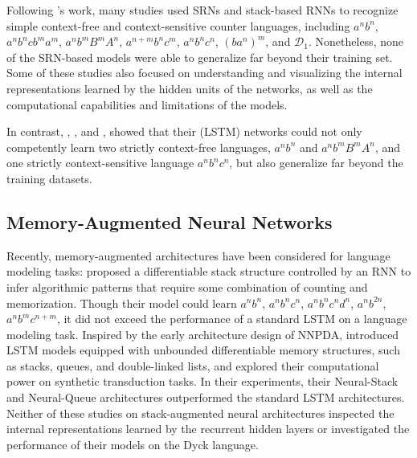 \documentclass[11pt,a4paper]{article}
\theoremstyle{plain}
\newcommand{\dyck}[1]{\ensuremath{\mathcal{D}_{#1}}}
\begin{document}
Following \citeauthor{elman1991distributed}'s work, many studies used SRNs \citep{steijvers1996recurrent, tonkes1997learning,holldobler1997designing,rodriguez1998recurrent,boden1999learning, boden2000context,rodriguez2001simple} and stack-based RNNs \cite{das1993using,zeng1994discrete} to recognize simple context-free and context-sensitive counter languages, including $a^n b^n$, $a^nb^ncb^ma^m$, $a^nb^mB^mA^n$, $a^{n+m}b^nc^{m}$, $a^n b^n c^n$, $(ba^n)^m$, and \dyck{1}. Nonetheless, none of the SRN-based models were able to generalize far beyond their training set. Some of these studies also focused on understanding and visualizing the internal representations learned by the hidden units of the networks, as well as the computational capabilities and limitations of the models.

In contrast, \citet{gers2001lstm}, \citet{schmidhuber2002learning}, and \citet{gers2002learning}, showed that their (LSTM) networks could not only competently learn two strictly context-free languages, $a^n b^n$ and $a^n b^m B^m A^n$, and one strictly context-sensitive language $a^n b^n c^n$, but also generalize far beyond the training datasets. 

\vspace{-0.5em}
 \subsection{Memory-Augmented Neural Networks}
Recently, memory-augmented architectures have been considered for language modeling tasks: \citet{joulin2015inferring} proposed a differentiable stack structure controlled by an RNN to infer algorithmic patterns that require some combination of counting and memorization. Though their model could learn $a^n b^n$, $a^n b^n c^n$, $a^n b^n c^n d^n$, $a^nb^{2n}$, $a^nb^mc^{n+m}$, it did not exceed the performance of a standard LSTM on a language modeling task. Inspired by the early architecture design of NNPDA, \citet{grefenstette2015learning} introduced LSTM models equipped with unbounded differentiable memory structures, such as stacks, queues, and double-linked lists, and explored their computational power on synthetic transduction tasks. In their experiments, their Neural-Stack and Neural-Queue architectures outperformed the standard LSTM architectures. Neither of these studies on stack-augmented neural architectures inspected the internal representations learned by the recurrent hidden layers or investigated the performance of their models on the Dyck language.
\end{document}
